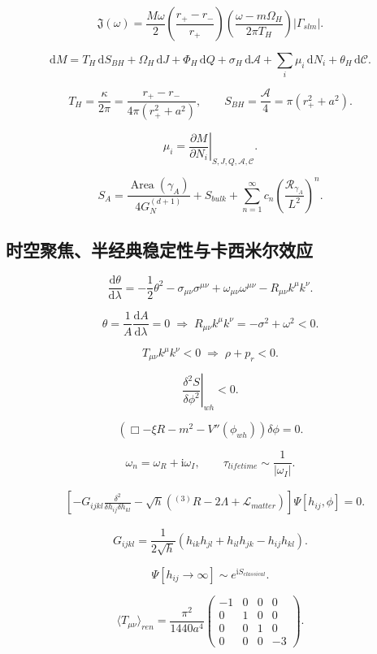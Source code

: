 \documentclass[UTF8,11pt,a4paper]{ctexart}
\newcommand{\R}{\mathcal{R}}
\newcommand{\A}{\mathcal{A}}
\newcommand{\C}{\mathcal{C}}
\newcommand{\Lag}{\mathcal{L}}
\newcommand{\Area}{\operatorname{Area}}
\newcommand{\dd}{\mathrm{d}}
\newcommand{\ii}{\mathrm{i}}
\begin{document}
\[
\mathfrak{J}(\omega)
=\frac{M\omega}{2}\left(\frac{r_+-r_-}{r_+}\right)
\left(\frac{\omega-m\Omega_H}{2\pi T_H}\right)|\Gamma_{slm}|.
\]

\[
\dd M=T_H\,\dd S_{BH}+\Omega_H\,\dd J+\Phi_H\,\dd Q
+\sigma_H\,\dd\A+\sum_i\mu_i\,\dd N_i+\theta_H\,\dd\C.
\]

\[
T_H=\frac{\kappa}{2\pi}=\frac{r_+-r_-}{4\pi(r_+^2+a^2)},
\qquad
S_{BH}=\frac{\A}{4}=\pi(r_+^2+a^2).
\]

\[
\mu_i=\left.\frac{\partial M}{\partial N_i}\right|_{S,J,Q,\A,\C}.
\]

\[
S_A=\frac{\Area(\gamma_A)}{4G_N^{(d+1)}}+S_{bulk}
+\sum_{n=1}^{\infty}c_n\left(\frac{\R_{\gamma_A}}{L^2}\right)^n.
\]

\subsection{时空聚焦、半经典稳定性与卡西米尔效应}

\[
\frac{\dd\theta}{\dd\lambda}
=-\frac12\theta^2-\sigma_{\mu\nu}\sigma^{\mu\nu}
+\omega_{\mu\nu}\omega^{\mu\nu}-R_{\mu\nu}k^\mu k^\nu.
\]

\[
\theta=\frac1A\frac{\dd A}{\dd\lambda}=0
\;\Longrightarrow\;
R_{\mu\nu}k^\mu k^\nu=-\sigma^2+\omega^2<0.
\]

\[
T_{\mu\nu}k^\mu k^\nu<0
\;\Longrightarrow\;
\rho+p_r<0.
\]

\[
\left.\frac{\delta^2S}{\delta\phi^2}\right|_{wh}<0.
\]

\[
\left(\Box-\xi R-m^2-V''(\phi_{wh})\right)\delta\phi=0.
\]

\[
\omega_n=\omega_R+\ii\omega_I,\qquad
\tau_{lifetime}\sim\frac{1}{|\omega_I|}.
\]

\begin{align*}
&\left[-G_{ijkl}\frac{\delta^2}{\delta h_{ij}\delta h_{kl}}
-\sqrt{h}\left({}^{(3)}R-2\Lambda+\Lag_{matter}\right)\right]
\Psi[h_{ij},\phi]=0.
\end{align*}

\[
G_{ijkl}=\frac{1}{2\sqrt{h}}
\left(h_{ik}h_{jl}+h_{il}h_{jk}-h_{ij}h_{kl}\right).
\]

\[
\Psi[h_{ij}\to\infty]\sim e^{\ii S_{classical}}.
\]

\[
\langle T_{\mu\nu}\rangle_{ren}
=\frac{\pi^2}{1440a^4}
\begin{pmatrix}
-1&0&0&0\\
0&1&0&0\\
0&0&1&0\\
0&0&0&-3
\end{pmatrix}.
\]
\end{document}
